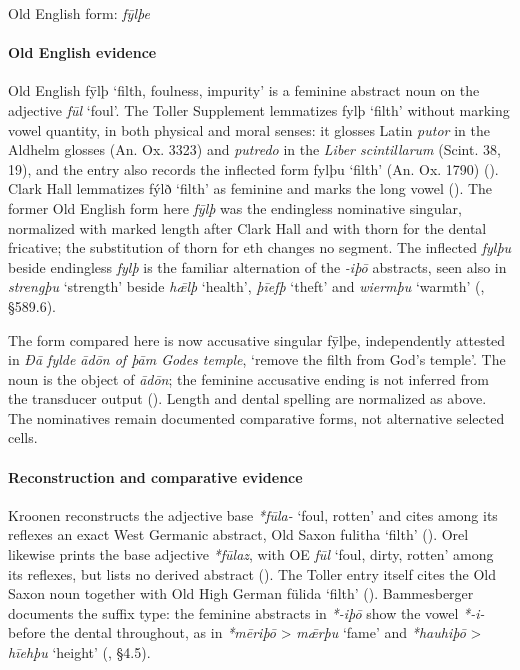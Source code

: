 \documentclass[
  british,
  a4paper,
]{article}
\providecommand{\Recon}[1]{\emph{*#1}}
\begin{document}
Old English form: \emph{fȳlþe}

\paragraph{Old English evidence}\label{old-english-evidence-21}

Old English {fȳlþ} `filth, foulness, impurity' is a feminine abstract
noun on the adjective \emph{fūl} `foul'. The Toller Supplement
lemmatizes {fylþ} `filth' without marking vowel quantity, in both
physical and moral senses: it glosses Latin \emph{putor} in the Aldhelm
glosses (An. Ox. 3323) and \emph{putredo} in the \emph{Liber
scintillarum} (Scint. 38, 19), and the entry also records the inflected
form {fylþu} `filth' (An. Ox. 1790) (). Clark Hall lemmatizes {fýlð} `filth' as feminine and marks
the long vowel (). The
former Old English form here \emph{fȳlþ} was the endingless nominative
singular, normalized with marked length after Clark Hall and with thorn
for the dental fricative; the substitution of thorn for eth changes no
segment. The inflected \emph{fylþu} beside endingless \emph{fylþ} is the
familiar alternation of the \emph{-iþō} abstracts, seen also in
\emph{strengþu} `strength' beside \emph{hǣlþ} `health', \emph{þīefþ}
`theft' and \emph{wiermþu} `warmth'
(, §589.6).

The form compared here is now accusative singular {fȳlþe}, independently
attested in \emph{Ðā fylde ādōn of þām Godes temple}, `remove the filth
from God's temple'. The noun is the object of \emph{ādōn}; the feminine
accusative ending is not inferred from the transducer output
(). Length and
dental spelling are normalized as above. The nominatives remain
documented comparative forms, not alternative selected cells.

\paragraph{Reconstruction and comparative
evidence}\label{reconstruction-and-comparative-evidence-21}

Kroonen reconstructs the adjective base \Recon{fūla-} `foul, rotten' and
cites among its reflexes an exact West Germanic abstract, Old Saxon
{fulitha} `filth' (). Orel
likewise prints the base adjective \emph{*fūlaz}, with OE \emph{fūl}
`foul, dirty, rotten' among its reflexes, but lists no derived abstract
(). The Toller entry itself cites
the Old Saxon noun together with Old High German {fülida} `filth'
(). Bammesberger documents
the suffix type: the feminine abstracts in \emph{*-iþō} show the vowel
\emph{*-i-} before the dental throughout, as in \emph{*mēriþō}
\textgreater{} \emph{mǣrþu} `fame' and \emph{*hauhiþō} \textgreater{}
\emph{hīehþu} `height' (, §4.5).
\end{document}
